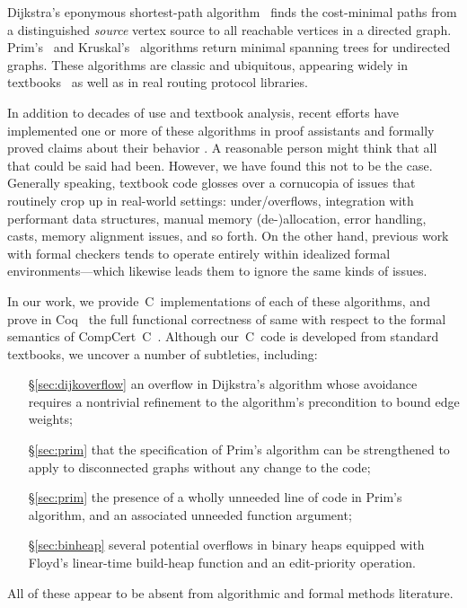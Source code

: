Dijkstra's eponymous shortest-path algorithm~\cite{DBLP:journals/nm/Dijkstra59} finds
the cost-minimal paths from a distinguished \emph{source} vertex
source to all reachable vertices in a directed graph. Prim's~\cite{prim} and Kruskal's~\cite{kruskal} algorithms return minimal spanning trees for undirected graphs.
These algorithms are classic and ubiquitous, appearing widely in textbooks~\cite{clrs,DBLP:books/daglib/0022194,heineman2008algorithms,rozen,kepnergilbert,sedgewick} as well as in real routing protocol libraries.

In addition to decades of use and textbook analysis, recent efforts have implemented one or more of these algorithms in proof
assistants and formally proved claims about their behavior \cite{Mizar,ACL2,Coq,cite,cite,cite}.  A reasonable person might think that all
that could be said had been.  However, we have found this not to be the case.  Generally speaking, textbook code glosses over a cornucopia
of issues that routinely crop up in real-world settings: under/overflows, integration with performant data structures, manual memory (de-)allocation,
error handling, casts, memory alignment issues, and so forth.  On the other hand, previous work with formal checkers tends to operate entirely
within idealized formal environments---which likewise leads them to ignore the same kinds of issues.

In our work, we provide~C~implementations of each of these algorithms, and prove in Coq~\cite{Coq} the full functional correctness of same with respect to
the formal semantics of CompCert~C~\cite{leroy:compcert}.  Although our~C~code is developed from standard textbooks, we uncover a number of subtleties, including:
\begin{itemize}
\item[\S\ref{sec:dijkoverflow}] an overflow in Dijkstra's algorithm whose avoidance requires a nontrivial refinement to the algorithm's precondition to bound edge weights;
\item[\S\ref{sec:prim}] that the specification of Prim's algorithm can be strengthened to apply to disconnected graphs without any change to the code;
\item[\S\ref{sec:prim}] the presence of a wholly unneeded line of code in Prim's algorithm, and an associated unneeded function argument;
\item[\S\ref{sec:binheap}] several potential overflows in binary heaps equipped with Floyd's linear-time build-heap function and an edit-priority operation.
\end{itemize}
All of these appear to be absent from algorithmic and formal methods literature.

